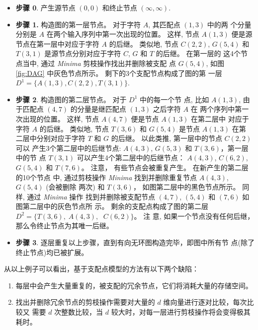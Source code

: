 \documentclass[utf8]{frontiersSCNS} %
\begin{document}
\begin{itemize}
\item \textbf{步骤 0}. 产生源节点 $(0,0)$ 和终止节点 $(\infty, \infty)$.
\item \textbf{步骤 1.} 构造图的第一层节点。 对于字符 $A$, 其匹配点 $(1,3)$ 中的两
  个分量分别是 $A$ 在两个输入序列中第一次出现的位置。 这样, 节点 $A(1,3)$ 便是源
  节点在第一层中对应于字符 $A$ 的后继。 类似地, 节点 $C(2,2)$,
  $G(5,4)$ 和 $T(3,1)$ 是源节点分别对应于字符 $C$, $G$ 和 $T$ 的后继。 在第一层的
  这4个节点当中, 通过 \emph{Minima} 剪枝操作找出并删除被支配
  点 $G(5,4)$, 如图 \ref{fig:DAG} 中灰色节点所示。 剩下的3个支配节点构成了图的第
  一层 $D^1=\{A(1,3),C(2,2),T(3,1)\}$.
  
\item \textbf{步骤 2}. 构造图的第二层节点。 对于 $D^1$ 中的每一个节
  点, 比如 $A(1,3)$, 由于匹配点 $(4,7)$ 的分量是继匹配点 $(1,3)$ 之后字符 $A$ 在
  两个序列中第一次出现的位置。 这样, 节点 $A(4,7)$ 便是节点 $A(1, 3)$ 在第二层中
  对应于字符 $A$ 的后继。 类似地, 节点 $T(3,6)$ 和 $G(5,4)$ 是节点 $A(1, 3)$ 在第
  二层中分别对应于字符 $T$ 和 $G$ 的后继。 以此类推, 第一层中的节点 $C(2,2)$ 可以
  产生3个第二层中的后继节点: $A(4,3)$, $G(5,3)$ 和 $T(3,6)$，第一层中的节
  点 $T(3,1)$ 可以产生4个第二层中的后继节点： $A(4,3)$, $C(6,2)$,
  $G(5,4)$ 和 $T(7,6)$。 注意， 有些节点会被重复产生。 在新产生的第二层的10个节点
  中, 通过剪枝操作 \emph{Minima} 找到并删除重复节点 $A(4,3)$, $G(5,4)$ (会被删除
  两次) 和 $T(3,6)$， 如图第二层中的黑色节点所示。 同样, 通过 \emph{Minima} 操作
  找到并删除被支配节点 $(4, 7)$, $(5, 4)$ 和 $(7, 6)$ 如图第二层中的灰色节点所
  示。 剩余的支配点构成了图的第二层 $D^2=\{T(3, 6),\; A(4, 3),\;$ $C(6,2)\}$。 注
  意, 如果一个节点没有任何后继，那么令终止节点为其唯一后继。
\item \textbf{步骤 3}. 逐层重复以上步骤，直到有向无环图构造完毕，即图中所有节
  点(除了终止节点)均已被扩展。
  
\end{itemize}

从以上例子可以看出，基于支配点模型的方法有以下两个缺陷：
\begin{enumerate}
\item 每层中会产生大量重复的，被支配的冗余节点，它们将消耗大量的存储空间。
\item 找出并删除冗余节点的剪枝操作需要对大量的 $d$ 维向量进行逐对比较，每次比较又
  需要 $d$ 次整数比较，当 $d$ 较大时，对每一层进行剪枝操作将会变得极其耗时。
\end{enumerate}
\end{document}

